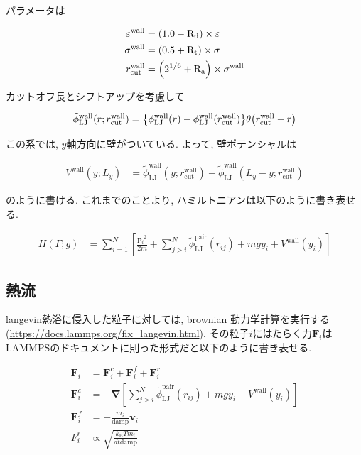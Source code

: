 \documentclass[dvipdfmx]{jsarticle}
\numberwithin{equation}{subsection}
\begin{document}
パラメータは

\begin{align}
  \varepsilon^{\text{wall}} &= \qty(1.0 - \text{R}_\text{d}) \times \varepsilon \\
  \sigma^{\text{wall}} &= \qty(0.5 + \text{R}_\text{t}) \times \sigma \\
  r^{\text{wall}}_{\text{cut}} &= \qty(2^{1/6} + \text{R}_\text{a}) \times \sigma^{\text{wall}}
\end{align}

カットオフ長とシフトアップを考慮して

\begin{align}
  \tilde{\phi}_{\text{LJ}}^{\text{wall}}(r;r_{\text{cut}}^{\text{wall}}) = \qty{\phi_{\text{LJ}}^{\text{wall}}(r) - \phi_{\text{LJ}}^{\text{wall}}(r_{\text{cut}}^{\text{wall}})}\theta \qty(r_{\text{cut}}^{\text{wall}}-r) \\
\end{align}

この系では, $y$軸方向に壁がついている. よって, 壁ポテンシャルは

\begin{align}
  V^{\text{wall}}(y; L_y) &= \tilde{\phi}_{\text{LJ}}^{\text{wall}}(y;r_{\text{cut}}^{\text{wall}}) + \tilde{\phi}_{\text{LJ}}^{\text{wall}}(L_y - y;r_{\text{cut}}^{\text{wall}})
\end{align}

のように書ける. これまでのことより, ハミルトニアンは以下のように書き表せる.

\begin{align}
  \label{Hamiltonian}
    H(\Gamma; g)
    &= \sum_{i=1}^{N}
    \left[
      \frac{{\bm{p}_i}^2}{2m} 
      + \sum_{j > i}^{N}
        \tilde{\phi}_{\text{LJ}}^{\text{pair}}(r_{ij})
      + mgy_i +V^{\text{wall}}(y_i)
    \right]
\end{align}

\subsection{熱流}

langevin熱浴に侵入した粒子に対しては, brownian 動力学計算を実行する(\url{https://docs.lammps.org/fix_langevin.html}). その粒子$i$にはたらく力$\bm{F}_i$はLAMMPSのドキュメントに則った形式だと以下のように書き表せる.

\begin{align}
  \bm{F}_i &= \bm{F}_i^c + \bm{F}_i^f + \bm{F}_i^r \\
  \bm{F}_i^c &= - \bm{\nabla} 
  \left[
    \sum_{j > i}^{N}
        \tilde{\phi}_{\text{LJ}}^{\text{pair}}(r_{ij})
      + mgy_i +V^{\text{wall}}(y_i)
  \right]  \\
  \bm{F}_i^f &= -\frac{m_i}{\text{damp}}\bm{v}_i \\
  F_i^r &\propto \sqrt{\frac{k_\text{B} Tm_i}{dt \text{damp}}}
\end{align}
\end{document}
